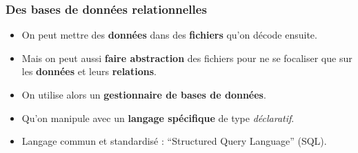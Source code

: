\subsubsection{Des bases de données relationnelles}
\begin{slide}
	\begin{itemize}
		\item On peut mettre des \textbf{données} dans des \textbf{fichiers} qu'on décode ensuite.
		\item Mais on peut aussi \textbf{faire abstraction} des fichiers pour ne se focaliser que sur les \textbf{données} et leurs \textbf{relations}.
	\end{itemize}
\end{slide}

\begin{slide}
	\begin{itemize}
		\item On utilise alors un \textbf{gestionnaire de bases de données}.
		\item Qu'on manipule avec un \textbf{langage spécifique} de type \emph{déclaratif}.
		\item Langage commun et standardisé : \enquote{Structured Query Language} (SQL).
	\end{itemize}
\end{slide}


